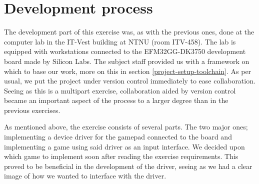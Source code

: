 \section{Development process}

The development part of this exercise was, as with the previous ones, done at the computer lab in the IT-Vest building at NTNU (room ITV-458). The lab is equipped with workstations connected to the EFM32GG-DK3750 development board made by Silicon Labs.
The subject staff provided us with a framework on which to base our work, more on this in section \ref{project-setup-toolchain}.
As per usual, we put the project under version control immediately to ease collaboration. Seeing as this is a multipart exercise, collaboration aided by version control became an important aspect of the process to a larger degree than in the previous exercises.

As mentioned above, the exercise consists of several parts. The two major ones; implementing a device driver for the gamepad connected to the board and implementing a game using said driver as an input interface. We decided upon which game to implement soon after reading the exercise requirements. This proved to be beneficial in the development of the driver, seeing as we had a clear image of how we wanted to interface with the driver.


